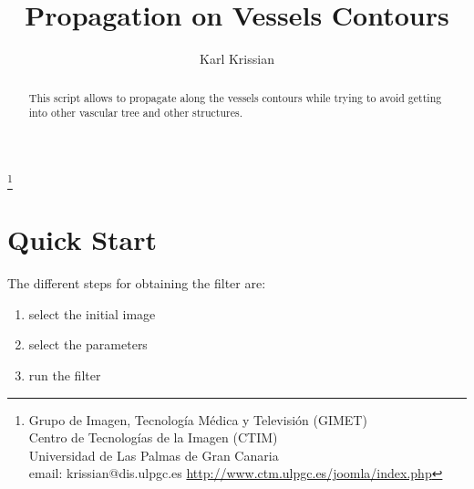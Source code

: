 \documentclass{article}
\begin{document}
\title{Propagation on Vessels Contours}
\author{ Karl Krissian
}
\thanks{
Grupo de Imagen, Tecnolog\'ia M\'edica y Televisi\'on (GIMET)\\
Centro de Tecnolog\'ias de la Imagen (CTIM)\\
Universidad de Las Palmas de Gran Canaria\\
email: krissian@dis.ulpgc.es
\url{http://www.ctm.ulpgc.es/joomla/index.php}
}


\maketitle

\begin{abstract}
This script allows to propagate along the vessels contours while trying to avoid getting into other vascular tree and other structures.
\end{abstract}


\section{Quick Start}

The different steps for obtaining the filter are:
\begin{enumerate}
  \item select the initial image
  \item select the parameters
  \item run the filter
\end{enumerate}
\end{document}
